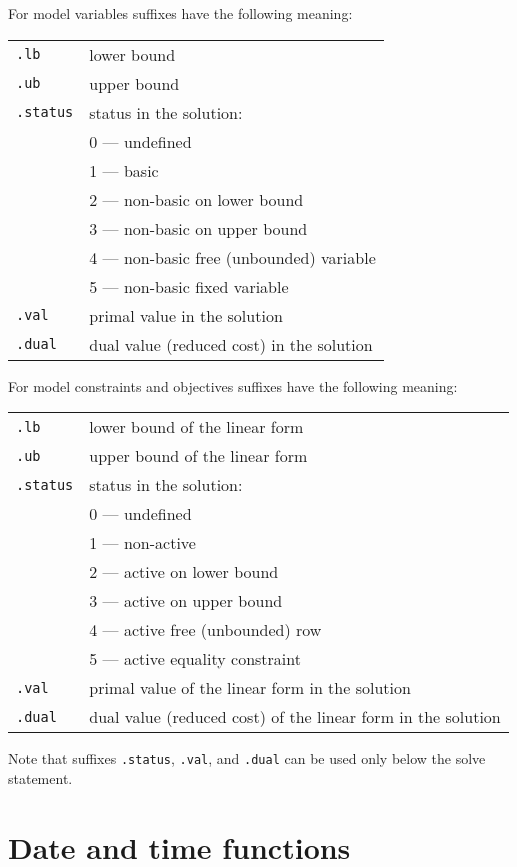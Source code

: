 \documentclass[11pt]{report}
\begin{document}
For model variables suffixes have the following meaning:

\begin{tabular}{@{}ll@{}}
{\tt.lb}&lower bound\\
{\tt.ub}&upper bound\\
{\tt.status}&status in the solution:\\
&0 --- undefined\\
&1 --- basic\\
&2 --- non-basic on lower bound\\
&3 --- non-basic on upper bound\\
&4 --- non-basic free (unbounded) variable\\
&5 --- non-basic fixed variable\\
{\tt.val}&primal value in the solution\\
{\tt.dual}&dual value (reduced cost) in the solution\\
\end{tabular}

For model constraints and objectives suffixes have the following
meaning:

\begin{tabular}{@{}ll@{}}
{\tt.lb}&lower bound of the linear form\\
{\tt.ub}&upper bound of the linear form\\
{\tt.status}&status in the solution:\\
&0 --- undefined\\
&1 --- non-active\\
&2 --- active on lower bound\\
&3 --- active on upper bound\\
&4 --- active free (unbounded) row\\
&5 --- active equality constraint\\
{\tt.val}&primal value of the linear form in the solution\\
{\tt.dual}&dual value (reduced cost) of the linear form in the
solution\\
\end{tabular}

Note that suffixes {\tt.status}, {\tt.val}, and {\tt.dual} can be used
only below the solve statement.


\chapter{Date and time functions}
\end{document}
